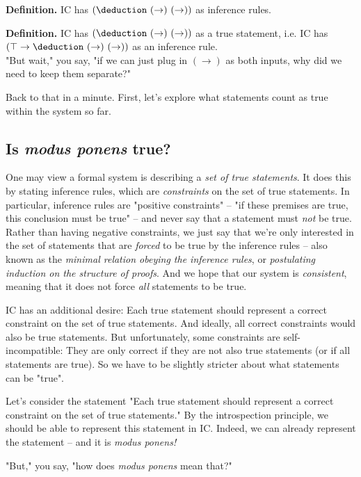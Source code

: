\documentclass{article}
\begin{document}
  \textbf{Definition.} IC has $(\deduction\ (\to)\ (\to))$ as inference rules.
  
  \textbf{Definition.} IC has $(\deduction\ (\to)\ (\to))$ as a true statement, i.e. IC has $(\top \to \deduction\ (\to)\ (\to))$ as an inference rule.
  \\
  
  "But wait," you say, "if we can just plug in $(\to)$ as both inputs, why did we need to keep them separate?"
  
  Back to that in a minute. First, let's explore what statements count as true within the system so far.
  
  \subsection{Is \emph{modus ponens} true?}
  
  One may view a formal system is describing a \emph{set of true statements}. It does this by stating inference rules, which are \emph{constraints} on the set of true statements. In particular, inference rules are "positive constraints" – "if these premises are true, this conclusion must be true" – and never say that a statement must \emph{not} be true. Rather than having negative constraints, we just say that we're only interested in the set of statements that are \emph{forced} to be true by the inference rules – also known as the \emph{minimal relation obeying the inference rules}, or \emph{postulating induction on the structure of proofs}. And we hope that our system is \emph{consistent}, meaning that it does not force \emph{all} statements to be true.
  
  IC has an additional desire: Each true statement should represent a correct constraint on the set of true statements. And ideally, all correct constraints would also be true statements. But unfortunately, some constraints are self-incompatible: They are only correct if they are not also true statements (or if all statements are true). So we have to be slightly stricter about what statements can be "true".
  
  Let's consider the statement "Each true statement should represent a correct constraint on the set of true statements." By the introspection principle, we should be able to represent this statement in IC. Indeed, we can already represent the statement – and it is \emph{modus ponens!}
  
  "But," you say, "how does \emph{modus ponens} mean that?"
  
\end{document}
